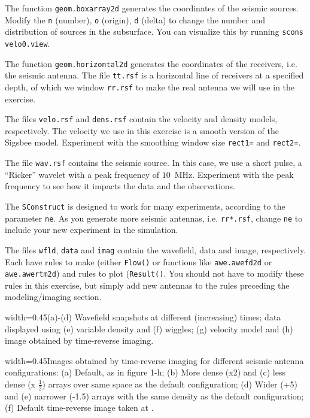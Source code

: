 The function \texttt{geom.boxarray2d} generates the coordinates of the
seismic sources. Modify the \texttt{n} (number), \texttt{o} (origin),
\texttt{d} (delta) to change the number and distribution of sources in
the subsurface. You can visualize this by running \texttt{scons
  velo0.view}.

The function \texttt{geom.horizontal2d} generates the coordinates of
the receivers, i.e. the seismic antenna. The file \texttt{tt.rsf} is a
horizontal line of receivers at a specified depth, of which we window
\texttt{rr.rsf} to make the real antenna we will use in the exercise.

The files \texttt{velo.rsf} and \texttt{dens.rsf} contain the velocity
and density models, respectively. The velocity we use in this exercise
is a smooth version of the Sigsbee model. Experiment with the
smoothing window size \texttt{rect1=} and \texttt{rect2=}.

The file \texttt{wav.rsf} contains the seismic source. In this case,
we use a short pulse, a ``Ricker'' wavelet with a peak frequency of
$10$~MHz. Experiment with the peak frequency to see how it impacts the
data and the observations. 

The \texttt{SConstruct} is designed to work for many experiments,
according to the parameter \texttt{ne}. As you generate more seismic
antennas, i.e. \texttt{rr*.rsf}, change \texttt{ne} to include your
new experiment in the simulation.

The files \texttt{wfld}, \texttt{data} and \texttt{imag} contain the
wavefield, data and image, respectively. Each have rules to make
(either \texttt{Flow()} or functions like \texttt{awe.awefd2d} or
\texttt{awe.awertm2d}) and rules to plot (\texttt{Result()}. You
should not have to modify these rules in this exercise, but simply add
new antennas to the rules preceding the modeling/imaging section.

{width=0.45\textwidth}{(a)-(d) Wavefield snapshots at different (increasing)
times; data displayed using (e) variable density and (f) wiggles; (g)
velocity model and (h) image obtained by time-reverse imaging.}

{width=0.45\textwidth}{Images obtained by time-reverse imaging for different seismic antenna configurations: (a) Default, as in figure 1-h; (b) More dense (x2) and (c) less dense (x $\frac{1}{2}$) arrays over same space as the default configuration; (d) Wider (+5) and (e) narrower (-1.5) arrays with the same density as the default configuration; (f) Default time-reverse image taken at .}

